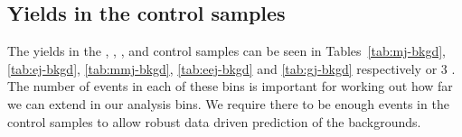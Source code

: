 \begin{table}[h]
\begin{tabular}
\hline\hline
  \end{tabular}
\end{table}

\newpage
\subsection{Yields in the control samples}

The yields in the \mj, \mmj, \ej, \eej and \gj control samples can be seen in
Tables~\ref{tab:mj-bkgd}, \ref{tab:ej-bkgd}, \ref{tab:mmj-bkgd}, \ref{tab:eej-bkgd}
and \ref{tab:gj-bkgd} respectively or 3 \ifb. 
The number of events in each of these bins is important for
working out how far we can extend in our analysis bins. We require there to be
enough events in the control samples to allow robust data driven prediction of
the backgrounds.

